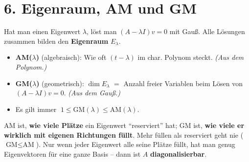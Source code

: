 \documentclass[a4paper,12pt]{article}
\begin{document}
\section*{6. Eigenraum, AM und GM}

Hat man einen Eigenwert $\lambda$, l\"ost man $(A - \lambda I)v = 0$ mit Gau\ss. Alle L\"osungen zusammen bilden den \textbf{Eigenraum} $E_\lambda$.

\begin{merkbox}[title={Zwei Vielfachheiten -- nicht verwechseln!}]
\begin{itemize}[leftmargin=*, nosep]
    \item \textbf{AM($\lambda$)} (algebraisch): Wie oft $(t - \lambda)$ im char. Polynom steckt. \emph{(Aus dem Polynom.)}
    \item \textbf{GM($\lambda$)} (geometrisch): $\dim E_\lambda$ $=$ Anzahl freier Variablen beim L\"osen von $(A - \lambda I)v = 0$. \emph{(Aus dem Gau\ss.)}
    \item Es gilt immer $\;1 \le \text{GM}(\lambda) \le \text{AM}(\lambda)$.
\end{itemize}
\end{merkbox}

\begin{center}
\end{center}

\begin{analogie}
AM ist, \textbf{wie viele Pl\"atze} ein Eigenwert ``reserviert'' hat; GM ist, \textbf{wie viele er wirklich mit eigenen Richtungen f\"ullt}. Mehr f\"ullen als reserviert geht nie ($\text{GM} \le \text{AM}$). Nur wenn jeder Eigenwert alle seine Pl\"atze f\"ullt, hat man genug Eigenvektoren f\"ur eine ganze Basis -- dann ist $A$ \textbf{diagonalisierbar}.
\end{analogie}
\end{document}
